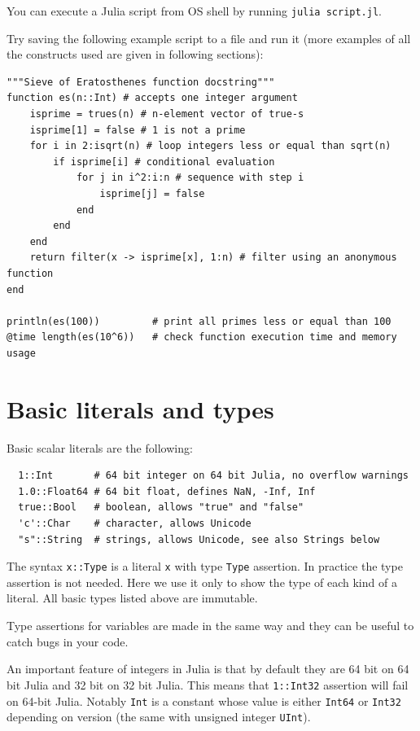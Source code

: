 \documentclass[10pt,a4paper]{article}
\begin{document}
You can execute a Julia script from OS shell by running \lstinline|julia script.jl|.

Try saving the following example script to a file and run it (more examples of
all the constructs used are given in following sections):
\begin{lstlisting}
"""Sieve of Eratosthenes function docstring"""
function es(n::Int) # accepts one integer argument
    isprime = trues(n) # n-element vector of true-s
    isprime[1] = false # 1 is not a prime
    for i in 2:isqrt(n) # loop integers less or equal than sqrt(n)
        if isprime[i] # conditional evaluation
            for j in i^2:i:n # sequence with step i
                isprime[j] = false
            end
        end
    end
    return filter(x -> isprime[x], 1:n) # filter using an anonymous function
end

println(es(100))         # print all primes less or equal than 100
@time length(es(10^6))   # check function execution time and memory usage
\end{lstlisting}

\section{Basic literals and types}
Basic scalar literals are the following:
\begin{lstlisting}
  1::Int       # 64 bit integer on 64 bit Julia, no overflow warnings
  1.0::Float64 # 64 bit float, defines NaN, -Inf, Inf
  true::Bool   # boolean, allows "true" and "false"
  'c'::Char    # character, allows Unicode
  "s"::String  # strings, allows Unicode, see also Strings below
\end{lstlisting}
The syntax \lstinline|x::Type| is a literal \lstinline|x| with type
\lstinline|Type| assertion. In practice the type assertion is not needed. Here
we use it only to show the type of each kind of a literal. All basic types
listed above are immutable.

Type assertions for variables are made in the same way and they can be useful to
catch bugs in your code.

An important feature of integers in Julia is that by default they are 64 bit on
64 bit Julia and 32 bit on 32 bit Julia. This means that \lstinline|1::Int32|
assertion will fail on 64-bit Julia. Notably \lstinline|Int| is a constant whose
value is either \lstinline|Int64| or \lstinline|Int32| depending on version (the
same with unsigned integer \lstinline|UInt|).
\end{document}
